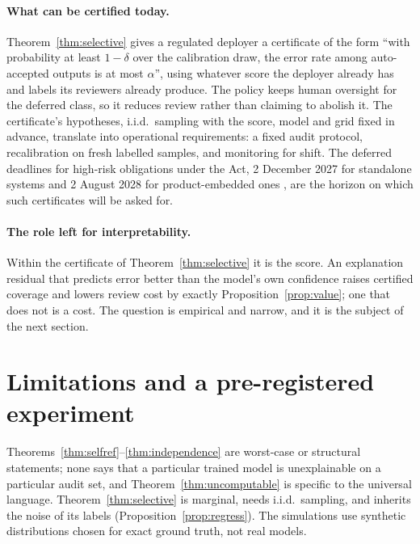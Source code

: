 \documentclass[11pt,letterpaper]{article}
\theoremstyle{plain}
\theoremstyle{definition}
\theoremstyle{remark}
\begin{document}
\paragraph{What can be certified today.} Theorem~\ref{thm:selective} gives a regulated deployer a certificate of the form ``with probability at least $1-\delta$ over the calibration draw, the error rate among auto-accepted outputs is at most $\alpha$'', using whatever score the deployer already has and labels its reviewers already produce. The policy keeps human oversight for the deferred class, so it reduces review rather than claiming to abolish it. The certificate's hypotheses, i.i.d.\ sampling with the score, model and grid fixed in advance, translate into operational requirements: a fixed audit protocol, recalibration on fresh labelled samples, and monitoring for shift. The deferred deadlines for high-risk obligations under the Act, 2 December 2027 for standalone systems and 2 August 2028 for product-embedded ones \citep{euomnibus2026}, are the horizon on which such certificates will be asked for.

\paragraph{The role left for interpretability.} Within the certificate of Theorem~\ref{thm:selective} it is the score. An explanation residual that predicts error better than the model's own confidence raises certified coverage and lowers review cost by exactly Proposition~\ref{prop:value}; one that does not is a cost. The question is empirical and narrow, and it is the subject of the next section.

\section{Limitations and a pre-registered experiment}
\label{sec:experiment}

Theorems~\ref{thm:selfref}--\ref{thm:independence} are worst-case or structural statements; none says that a particular trained model is unexplainable on a particular audit set, and Theorem~\ref{thm:uncomputable} is specific to the universal language. Theorem~\ref{thm:selective} is marginal, needs i.i.d.\ sampling, and inherits the noise of its labels (Proposition~\ref{prop:regress}). The simulations use synthetic distributions chosen for exact ground truth, not real models.
\end{document}
